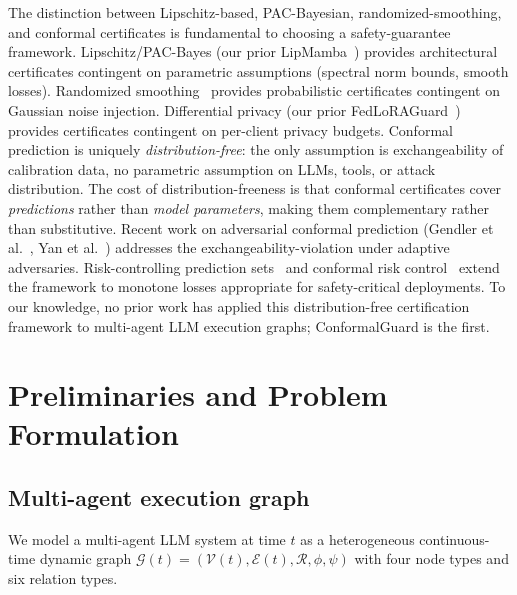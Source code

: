 \documentclass[12pt,a4paper]{article}
\theoremstyle{definition}
\theoremstyle{remark}
\newcommand{\modelname}{ConformalGuard}
\newcommand{\Vcal}{\mathcal{V}}
\newcommand{\Ecal}{\mathcal{E}}
\newcommand{\Gcal}{\mathcal{G}}
\newcommand{\Rcal}{\mathcal{R}}
\begin{document}
The distinction between Lipschitz-based, PAC-Bayesian, randomized-smoothing, and conformal certificates is fundamental to choosing a safety-guarantee framework. Lipschitz/PAC-Bayes (our prior LipMamba~\cite{anaedevha2026lipmamba_internal}) provides architectural certificates contingent on parametric assumptions (spectral norm bounds, smooth losses). Randomized smoothing~\cite{cohen2019certified} provides probabilistic certificates contingent on Gaussian noise injection. Differential privacy (our prior FedLoRAGuard~\cite{anaedevha2026robustidps}) provides certificates contingent on per-client privacy budgets. Conformal prediction is uniquely \emph{distribution-free}: the only assumption is exchangeability of calibration data, no parametric assumption on LLMs, tools, or attack distribution. The cost of distribution-freeness is that conformal certificates cover \emph{predictions} rather than \emph{model parameters}, making them complementary rather than substitutive. Recent work on adversarial conformal prediction (Gendler et al.~\cite{gendler2022adversarially}, Yan et al.~\cite{yan2024adversarial}) addresses the exchangeability-violation under adaptive adversaries. Risk-controlling prediction sets~\cite{bates2021distribution} and conformal risk control~\cite{angelopoulos2024conformal} extend the framework to monotone losses appropriate for safety-critical deployments. To our knowledge, no prior work has applied this distribution-free certification framework to multi-agent LLM execution graphs; \modelname{} is the first.


\section{Preliminaries and Problem Formulation}
\label{sec:preliminaries}

\subsection{Multi-agent execution graph}

We model a multi-agent LLM system at time $t$ as a heterogeneous continuous-time dynamic graph $\Gcal(t) = (\Vcal(t), \Ecal(t), \Rcal, \phi, \psi)$ with four node types and six relation types.
\end{document}
